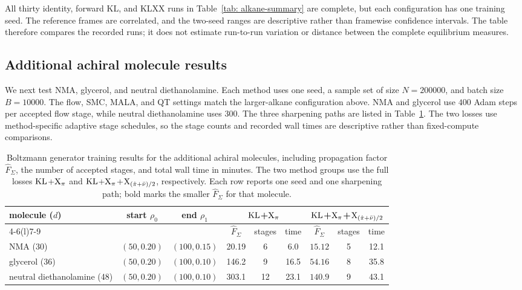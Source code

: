 \documentclass{article}
\begin{document}
All thirty identity, forward KL, and KLXX runs in Table~\ref{tab: alkane-summary} are complete, but each configuration has one training seed. The reference frames are correlated, and the two-seed ranges are descriptive rather than framewise confidence intervals. The table therefore compares the recorded runs; it does not estimate run-to-run variation or distance between the complete equilibrium measures.


\subsection{Additional achiral molecule results}
\label{sec: mol-achiral-results}

We next test NMA, glycerol, and neutral diethanolamine. Each method uses one seed, a sample set of size \(N=200000\), and batch size \(B=10000\). The flow, SMC, MALA, and QT settings match the larger-alkane configuration above. NMA and glycerol use \(400\) Adam steps per accepted flow stage, while neutral diethanolamine uses \(300\). The three sharpening paths are listed in Table~\ref{tab: mol-achiral-summary}. The two losses use method-specific adaptive stage schedules, so the stage counts and recorded wall times are descriptive rather than fixed-compute comparisons.

\begin{table}[htb]
\centering
\small
\setlength{\tabcolsep}{3.5pt}
\begin{tabular}{lcccccccc}
\toprule
\multirow{2}{*}{molecule (\(d\))} &
\multirow{2}{*}{start \(\rho_0\)} &
\multirow{2}{*}{end \(\rho_1\)} &
\multicolumn{3}{c}{$\mathrm{KL}$+$\mathrm{X}_\pi$} &
\multicolumn{3}{c}{$\mathrm{KL}$+$\mathrm{X}_\pi$+$\mathrm{X}_{(\hat\pi+\bar\nu)/2}$} \\
\cmidrule(lr){4-6}\cmidrule(l){7-9}
& & & \(\hat F_\Sigma\) & stages & time
  & \(\hat F_\Sigma\) & stages & time \\
\midrule
NMA (30) & \((50,0.20)\) & \((100,0.15)\)
& 20.19 & 6 & 6.0 & \(\mathbf{15.12}\) & 5 & 12.1 \\
\addlinespace
glycerol (36) & \((50,0.20)\) & \((100,0.10)\)
& 146.2 & 9 & 16.5 & \(\mathbf{54.16}\) & 8 & 35.8 \\
\addlinespace
neutral diethanolamine (48) & \((50,0.20)\) & \((100,0.10)\)
& 303.1 & 12 & 23.1 & \(\mathbf{140.9}\) & 9 & 43.1 \\
\bottomrule
\end{tabular}
\caption{Boltzmann generator training results for the additional achiral molecules, including propagation factor \(\hat F_\Sigma\), the number of accepted stages, and total wall time in minutes. The two method groups use the full losses $\mathrm{KL}$+$\mathrm{X}_\pi$ and $\mathrm{KL}$+$\mathrm{X}_\pi$+$\mathrm{X}_{(\hat\pi+\bar\nu)/2}$, respectively. Each row reports one seed and one sharpening path; bold marks the smaller \(\hat F_\Sigma\) for that molecule.}
\label{tab: mol-achiral-summary}
\end{table}
\end{document}
